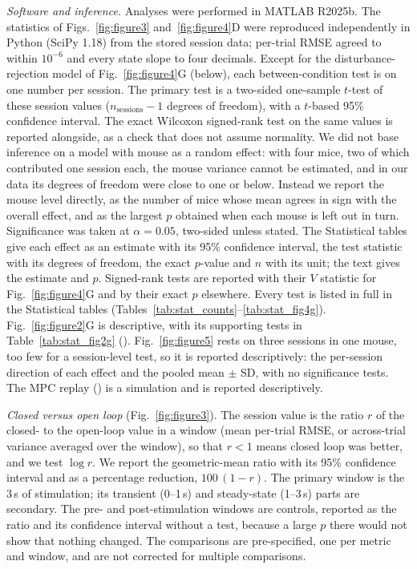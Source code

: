 \emph{Software and inference.} Analyses were performed in MATLAB R2025b.
The statistics of Figs.~\ref{fig:figure3} and~\ref{fig:figure4}D were reproduced independently in Python (SciPy 1.18) from the stored session data; per-trial RMSE agreed to within $10^{-6}$ and every state slope to four decimals.
Except for the disturbance-rejection model of Fig.~\ref{fig:figure4}G (below), each between-condition test is on one number per session.
The primary test is a two-sided one-sample $t$-test of these session values ($n_{\mathrm{sessions}} - 1$ degrees of freedom), with a $t$-based 95\% confidence interval.
The exact Wilcoxon signed-rank test on the same values is reported alongside, as a check that does not assume normality.
We did not base inference on a model with mouse as a random effect: with four mice, two of which contributed one session each, the mouse variance cannot be estimated, and in our data its degrees of freedom were close to one or below.
Instead we report the mouse level directly, as the number of mice whose mean agrees in sign with the overall effect, and as the largest $p$ obtained when each mouse is left out in turn.
Significance was taken at $\alpha = 0.05$, two-sided unless stated.
The Statistical tables give each effect as an estimate with its 95\% confidence interval, the test statistic with its degrees of freedom, the exact $p$-value and $n$ with its unit; the text gives the estimate and $p$.
Signed-rank tests are reported with their $V$ statistic for Fig.~\ref{fig:figure4}G and by their exact $p$ elsewhere.
Every test is listed in full in the Statistical tables (Tables~\ref{tab:stat_counts}--\ref{tab:stat_fig4g}).
Fig.~\ref{fig:figure2}G is descriptive, with its supporting tests in Table~\ref{tab:stat_fig2g} ().
Fig.~\ref{fig:figure5} rests on three sessions in one mouse, too few for a session-level test, so it is reported descriptively: the per-session direction of each effect and the pooled mean $\pm$ SD, with no significance tests.
The MPC replay () is a simulation and is reported descriptively.

\emph{Closed versus open loop} (Fig.~\ref{fig:figure3}).
The session value is the ratio $r$ of the closed- to the open-loop value in a window (mean per-trial RMSE, or across-trial variance averaged over the window), so that $r < 1$ means closed loop was better, and we test $\log r$.
We report the geometric-mean ratio with its 95\% confidence interval and as a percentage reduction, $100\,(1 - r)$.
The primary window is the 3\,s of stimulation; its transient (0--1\,s) and steady-state (1--3\,s) parts are secondary.
The pre- and post-stimulation windows are controls, reported as the ratio and its confidence interval without a test, because a large $p$ there would not show that nothing changed.
The comparisons are pre-specified, one per metric and window, and are not corrected for multiple comparisons.

